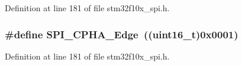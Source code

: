 Definition at line 181 of file stm32f10x\+\_\+spi.\+h.

\subsubsection[{\texorpdfstring{S\+P\+I\+\_\+\+C\+P\+H\+A\+\_\+2\+Edge}{SPI_CPHA_2Edge}}]{\setlength{\rightskip}{0pt plus 5cm}\#define S\+P\+I\+\_\+\+C\+P\+H\+A\+\_\+Edge~(({\bf uint16\+\_\+t})0x0001)}\hypertarget{group___s_p_i___clock___phase_ga7543f88bf05a08705eb4203862dcebdf}{}\label{group___s_p_i___clock___phase_ga7543f88bf05a08705eb4203862dcebdf}


Definition at line 181 of file stm32f10x\+\_\+spi.\+h.


